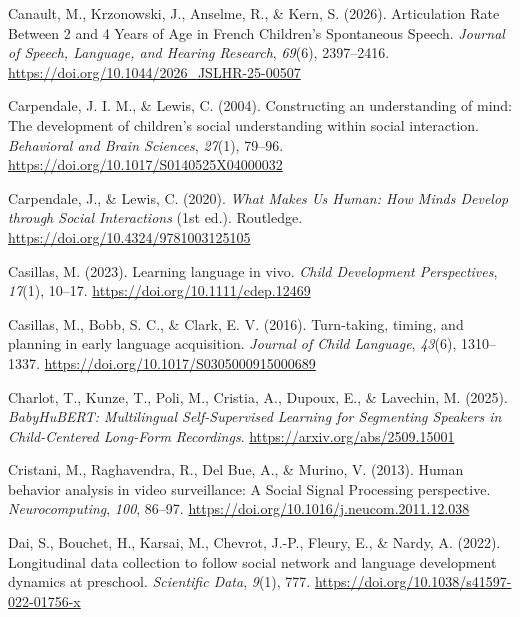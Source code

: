 \documentclass[
  english,
  12pt,
  man,floatsintext]{apa6}
\newlength{\cslhangindent}
\newenvironment{CSLReferences}[2] %
 {\begin{list}{}{%
  \setlength{\itemindent}{0pt}
  \setlength{\leftmargin}{0pt}
  \setlength{\parsep}{0pt}
  \ifodd #1
   \setlength{\leftmargin}{\cslhangindent}
   \setlength{\itemindent}{-1\cslhangindent}
  \fi
  \setlength{\itemsep}{#2\baselineskip}}}
 {\end{list}}
\begin{document}
\begin{CSLReferences}{1}{0}
Canault, M., Krzonowski, J., Anselme, R., \& Kern, S. (2026). Articulation {Rate Between} 2 and 4 {Years} of {Age} in {French Children}'s {Spontaneous Speech}. \emph{Journal of Speech, Language, and Hearing Research}, \emph{69}(6), 2397--2416. \url{https://doi.org/10.1044/2026_JSLHR-25-00507}

Carpendale, J. I. M., \& Lewis, C. (2004). Constructing an understanding of mind: {The} development of children's social understanding within social interaction. \emph{Behavioral and Brain Sciences}, \emph{27}(1), 79--96. \url{https://doi.org/10.1017/S0140525X04000032}

Carpendale, J., \& Lewis, C. (2020). \emph{What {Makes Us Human}: {How Minds Develop} through {Social Interactions}} (1st ed.). Routledge. \url{https://doi.org/10.4324/9781003125105}

Casillas, M. (2023). Learning language in vivo. \emph{Child Development Perspectives}, \emph{17}(1), 10--17. \url{https://doi.org/10.1111/cdep.12469}

Casillas, M., Bobb, S. C., \& Clark, E. V. (2016). Turn-taking, timing, and planning in early language acquisition. \emph{Journal of Child Language}, \emph{43}(6), 1310--1337. \url{https://doi.org/10.1017/S0305000915000689}

Charlot, T., Kunze, T., Poli, M., Cristia, A., Dupoux, E., \& Lavechin, M. (2025). \emph{{BabyHuBERT}: {Multilingual Self-Supervised Learning} for {Segmenting Speakers} in {Child-Centered Long-Form Recordings}}. \url{https://arxiv.org/abs/2509.15001}

Cristani, M., Raghavendra, R., Del Bue, A., \& Murino, V. (2013). Human behavior analysis in video surveillance: {A Social Signal Processing} perspective. \emph{Neurocomputing}, \emph{100}, 86--97. \url{https://doi.org/10.1016/j.neucom.2011.12.038}

Dai, S., Bouchet, H., Karsai, M., Chevrot, J.-P., Fleury, E., \& Nardy, A. (2022). Longitudinal data collection to follow social network and language development dynamics at preschool. \emph{Scientific Data}, \emph{9}(1), 777. \url{https://doi.org/10.1038/s41597-022-01756-x}


\end{CSLReferences}
\end{document}
